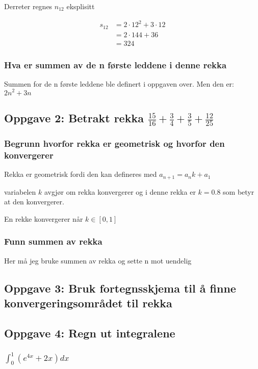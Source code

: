 \documentclass{article}
\begin{document}
Derreter regnes $n_{12}$ eksplisitt

\begin{align*}
    s_{12} &= 2 \cdot 12^2 + 3 \cdot 12 \\
    &= 2 \cdot 144 + 36 \\
    &= 324
\end{align*}

\subsubsection{Hva er summen av de n første leddene i denne rekka}

Summen for de n første leddene ble definert i oppgaven over. Men den er: $2n^2 + 3n$

\subsection{Oppgave 2: Betrakt rekka $\frac{15}{16} + \frac{3}{4} + \frac{3}{5} + \frac{12}{25}$}

\subsubsection{Begrunn hvorfor rekka er geometrisk og hvorfor den konvergerer}

Rekka er geometrisk fordi den kan defineres med $a_{n+1}=a_n k + a_1$

variabelen $k$ avgjør om rekka konvergerer og i denne rekka er $k=0.8$ som betyr at den konvergerer.

En rekke konvergerer når $k \in [0, 1]$

\subsubsection{Funn summen av rekka}

Her må jeg bruke summen av rekka og sette n mot uendelig

\subsection{Oppgave 3: Bruk fortegnsskjema til å finne konvergeringsområdet til rekka}


\subsection{Oppgave 4: Regn ut integralene}

\subsubsection{$\int_{0}^{1} (e^{4x}+2x) dx$}
\end{document}
